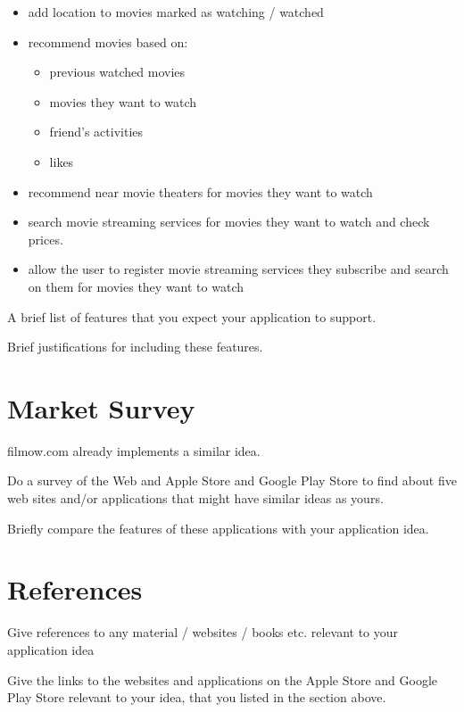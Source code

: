 \begin{itemize}
  \item add location to movies marked as watching / watched
  \item recommend movies based on:
    \begin{itemize}
      \item previous watched movies
      \item movies they want to watch
      \item friend's activities
      \item likes
    \end{itemize}
  \item recommend near movie theaters for movies they want to watch
  \item search movie streaming services for movies they want to watch and check
    prices.
  \item allow the user to register movie streaming services they subscribe and
    search on them for movies they want to watch
\end{itemize}

A brief list of features that you expect your application to support.

Brief justifications for including these features.

\section{Market Survey}

filmow.com already implements a similar idea.

Do a survey of the Web and Apple Store and Google Play Store to find about five
web sites and/or applications that might have similar ideas as yours.

Briefly compare the features of these applications with your application idea.

\section{References}

Give references to any material / websites / books etc. relevant to your
application idea

Give the links to the websites and applications on the Apple Store and Google
Play Store relevant to your idea, that you listed in the section above.

